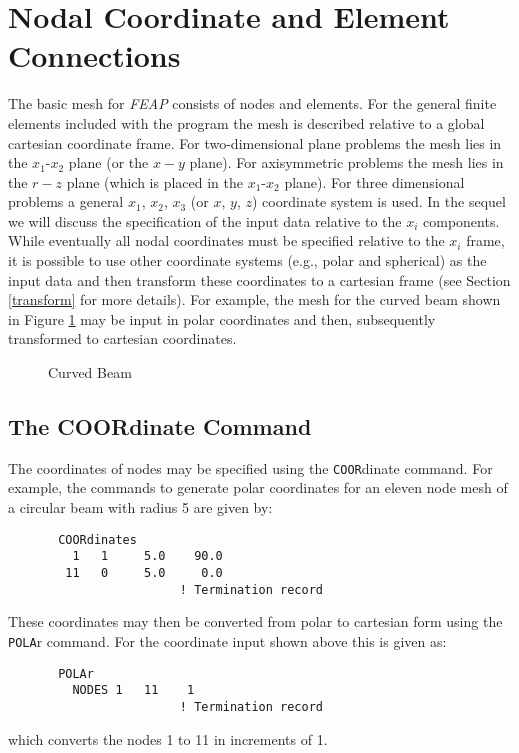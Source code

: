\section{Nodal Coordinate and Element Connections}

The basic mesh for {\sl FEAP} consists of nodes and elements.
For the general finite elements included with the program the mesh
is described relative to a global cartesian coordinate frame.  For
two-dimensional plane problems the mesh lies in the $x_1$-$x_2$ plane
(or the $x-y$ plane).  For axisymmetric problems the mesh lies in the
$r-z$ plane (which is placed in the $x_1$-$x_2$ plane).  For three
dimensional problems a general $x_1$, $x_2$, $x_3$ (or $x$, $y$, $z$)
coordinate system is used.  In the sequel we will discuss the specification
of the input data relative to the $x_i$ components.  While eventually all
nodal coordinates must be specified relative to the $x_i$ frame, it is
possible to use other coordinate systems (e.g., polar and spherical)
as the input data and
then transform these coordinates to a cartesian frame
(see Section \ref{transform} for more details).  For example,
the mesh for the curved beam shown in Figure \ref{fig71} may be input
in polar coordinates and then, subsequently transformed to
cartesian coordinates.

\begin{figure}[ht!]
\epsfxsize=1.6in
\caption{Curved Beam}
\label{fig71}
\end{figure}

\subsection{The COORdinate Command}
\label{coord}

The coordinates of nodes may be specified using the {\tt COOR}dinate
command.  For example,
the commands to generate polar coordinates for an eleven node mesh of a
circular beam with radius 5 are given by:
\begin{verbatim}
       COORdinates
         1   1     5.0    90.0
        11   0     5.0     0.0
                        ! Termination record
\end{verbatim}
These coordinates may then be converted from polar to cartesian form
using the {\tt POLA}r command.  For the coordinate input shown above this
is given as:
\begin{verbatim}
       POLAr
         NODES 1   11    1
                        ! Termination record
\end{verbatim}
which converts the nodes 1 to 11 in increments of 1.

